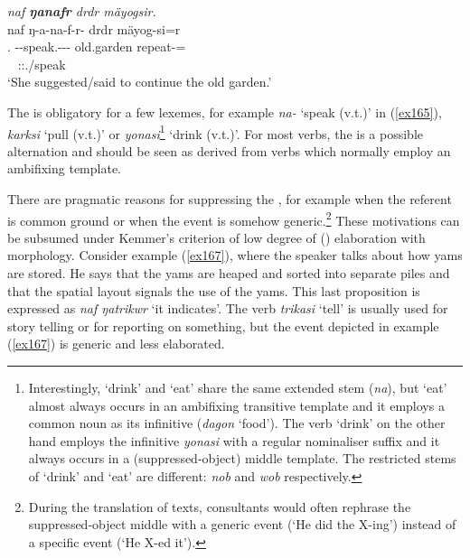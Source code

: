 \begin{exe}
	\ex \emph{naf \textbf{ŋanafr} drdr mäyogsir.}\\
	\glll naf ŋ-a-na-f-r-\Zero{} drdr mäyog-si=r\\
	\Tsg.\Erg{} \M-\Vc-speak.\Rs-\Ndu-\Lk-\Stsg{} old.garden repeat-\Nmlz=\Purp\\
	~ {\Stsg:\Sbj:\Nonpast.\Ipfv/speak} ~ ~\\
	\trans `She suggested/said to continue the old garden.' 
	\label{ex165}
\end{exe}

The   is obligatory for a few lexemes, for example \emph{na-} `speak (v.t.)' in (\ref{ex165}), \emph{karksi} `pull (v.t.)' or \emph{yonasi}\footnote{Interestingly, `drink' and `eat' share the same extended stem (\emph{na}), but `eat' almost always occurs in an ambifixing transitive template and it employs a common noun as its infinitive (\emph{dagon} `food'). The verb `drink' on the other hand employs the infinitive \emph{yonasi} with a regular nominaliser suffix and it always occurs in a (suppressed-object) middle template. The restricted stems of `drink' and `eat' are different: \emph{nob} and \emph{wob} respectively.} `drink (v.t.)'. For most verbs, the   is a possible alternation and should be seen as derived from verbs which normally employ an ambifixing  template.%

There are pragmatic reasons for suppressing the , for example when the referent is common ground or when the event is somehow generic.\footnote{During the translation of texts, consultants would often rephrase the suppressed-object middle with a generic event (`He did the X-ing') instead of a specific event (`He X-ed it').} These motivations can be subsumed under Kemmer's criterion of low degree of () elaboration with  morphology. Consider example (\ref{ex167}), where the speaker talks about how yams are stored. He says that the yams are heaped and sorted into separate piles and that the spatial layout signals the use of the yams. This last proposition is expressed as \emph{naf ŋatrikwr} `it indicates'. The verb \emph{trikasi} `tell' is usually used for story telling or for reporting on something, but the event depicted in example (\ref{ex167}) is generic and less elaborated.

